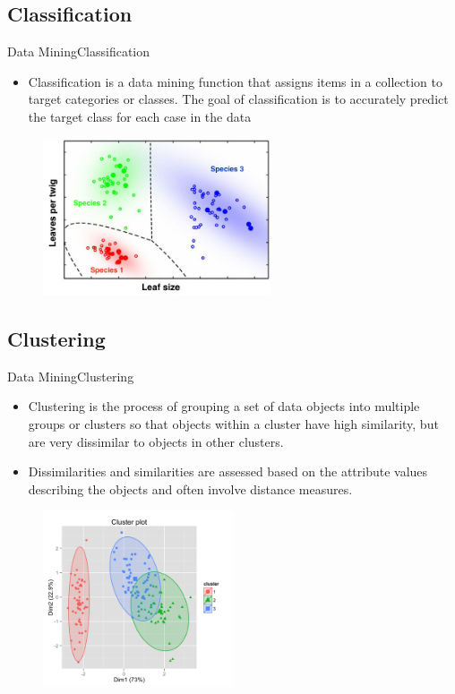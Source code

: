 \documentclass[10pt]{beamer}
\begin{document}
\subsection{Classification}
\begin{frame}{Data Mining}{Classification}
\begin{itemize}
\item Classification is a data mining function that assigns items in a collection to target categories or classes. The goal of classification is to accurately predict the target class for each case in the data


\end{itemize}
\begin{figure}[H]
	\centering
	\includegraphics[width=0.6\textwidth]{images/Classification.jpg}
 
\end{figure}

\end{frame}
\subsection{Clustering}
\begin{frame}{Data Mining}{Clustering}

\begin{itemize}
\item Clustering is the process of grouping a set of data objects into multiple groups or clusters
so that objects within a cluster have high similarity, but are very dissimilar to objects in
other clusters.
\item Dissimilarities and similarities are assessed based on the attribute values describing the
objects and often involve distance measures.

\end{itemize}
\begin{figure}[H]
	\centering
	\includegraphics[width=0.5\textwidth]{images/clustering.png}

\end{figure}
\end{frame}
\end{document}
